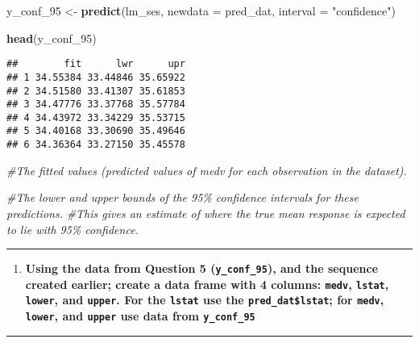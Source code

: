 \documentclass[
  12pt,
]{article}
\newenvironment{Shaded}{\begin{snugshade}}{\end{snugshade}}
\newcommand{\AttributeTok}[1]{\textcolor[rgb]{0.13,0.29,0.53}{#1}}
\newcommand{\CommentTok}[1]{\textcolor[rgb]{0.56,0.35,0.01}{\textit{#1}}}
\newcommand{\FunctionTok}[1]{\textcolor[rgb]{0.13,0.29,0.53}{\textbf{#1}}}
\newcommand{\NormalTok}[1]{#1}
\newcommand{\OtherTok}[1]{\textcolor[rgb]{0.56,0.35,0.01}{#1}}
\newcommand{\StringTok}[1]{\textcolor[rgb]{0.31,0.60,0.02}{#1}}
\providecommand{\tightlist}{%
  \setlength{\itemsep}{0pt}\setlength{\parskip}{0pt}}
\begin{document}
\begin{Shaded}
\begin{Highlighting}[]
\NormalTok{y\_conf\_95 }\OtherTok{\textless{}{-}} \FunctionTok{predict}\NormalTok{(lm\_ses, }\AttributeTok{newdata =}\NormalTok{ pred\_dat, }\AttributeTok{interval =} \StringTok{"confidence"}\NormalTok{)}

\FunctionTok{head}\NormalTok{(y\_conf\_95)}
\end{Highlighting}
\end{Shaded}

\begin{verbatim}
##        fit      lwr      upr
## 1 34.55384 33.44846 35.65922
## 2 34.51580 33.41307 35.61853
## 3 34.47776 33.37768 35.57784
## 4 34.43972 33.34229 35.53715
## 5 34.40168 33.30690 35.49646
## 6 34.36364 33.27150 35.45578
\end{verbatim}

\begin{Shaded}
\begin{Highlighting}[]
\CommentTok{\#The fitted values (predicted values of medv for each observation in the dataset).}

\CommentTok{\#The lower and upper bounds of the 95\% confidence intervals for these predictions.}
\CommentTok{\#This gives an estimate of where the true mean response is expected to lie with 95\% confidence.}
\end{Highlighting}
\end{Shaded}

\begin{center}\rule{0.5\linewidth}{0.5pt}\end{center}

\begin{enumerate}
\def\labelenumi{\arabic{enumi}.}
\setcounter{enumi}{5}
\tightlist
\item
  \textbf{Using the data from Question 5 (\texttt{y\_conf\_95}), and the
  sequence created earlier; create a data frame with 4 columns:
  \texttt{medv}, \texttt{lstat}, \texttt{lower}, and \texttt{upper}. For
  the \texttt{lstat} use the \texttt{pred\_dat\$lstat}; for
  \texttt{medv}, \texttt{lower}, and \texttt{upper} use data from
  \texttt{y\_conf\_95}}
\end{enumerate}

\begin{center}\rule{0.5\linewidth}{0.5pt}\end{center}
\end{document}
